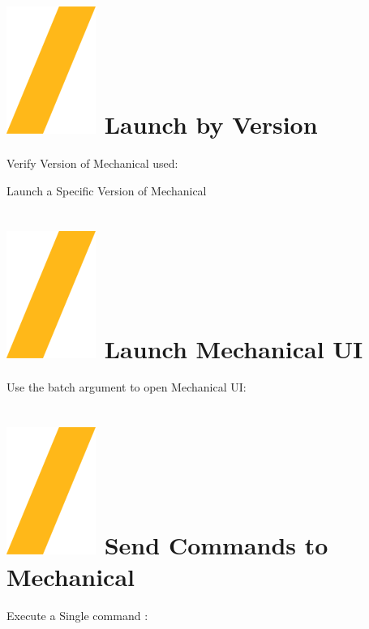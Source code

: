 \documentclass[9pt,landscape]{article}
\begin{document}
\begin{multicols}{3}
\section{\includegraphics[height=\fontcharht\font`\S]{slash.png} Launch by Version}

Verify Version of Mechanical used:


Launch a Specific Version of Mechanical




\vfill

\section{\includegraphics[height=\fontcharht\font`\S]{slash.png} Launch  Mechanical UI}

Use the batch argument to open Mechanical UI:

\section{\includegraphics[height=\fontcharht\font`\S]{slash.png} Send Commands to Mechanical}
Execute a Single command :


\end{multicols}
\end{document}
